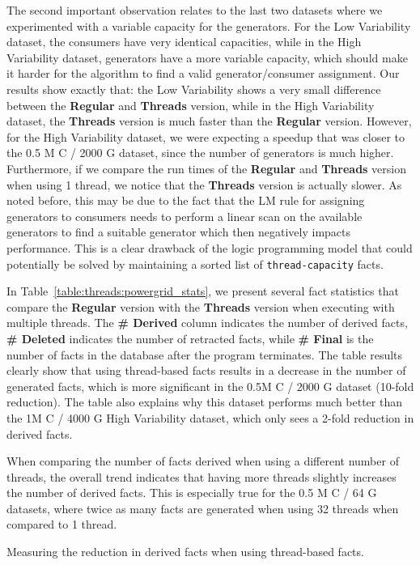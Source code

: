 The second important observation relates to the last two datasets where we
experimented with a variable capacity for the generators. For the Low
Variability dataset, the consumers have very identical capacities, while in the
High Variability dataset, generators have a more variable capacity, which should
make it harder for the algorithm to find a valid generator/consumer assignment.
Our results show exactly that: the Low Variability shows a very small difference
between the \textbf{Regular} and \textbf{Threads} version, while in the High
Variability dataset, the \textbf{Threads} version is much faster than the
\textbf{Regular} version. However, for the High Variability dataset, we were
expecting a speedup that was closer to the 0.5 M C / 2000 G dataset, since the
number of generators is much higher. Furthermore, if we compare the run times of
the \textbf{Regular} and \textbf{Threads} version when using 1 thread, we notice
that the \textbf{Threads} version is actually slower. As noted before, this may
be due to the fact that the LM rule for assigning generators to consumers needs
to perform a linear scan on the available generators to find a suitable
generator which then negatively impacts performance. This is a clear drawback of
the logic programming model that could potentially be solved by maintaining a
sorted list of \texttt{thread-capacity} facts.

In Table~\ref{table:threads:powergrid_stats}, we present several fact statistics
that compare the \textbf{Regular} version with the \textbf{Threads} version when
executing with multiple threads. The \textbf{\# Derived} column indicates the
number of derived facts, \textbf{\# Deleted} indicates the number of retracted
facts, while \textbf{\# Final} is the number of facts in the database after the
program terminates. The table results clearly show that using thread-based facts
results in a decrease in the number of generated facts, which is more
significant in the 0.5M C / 2000 G dataset (10-fold reduction). The table also
explains why this dataset performs much better than the 1M C / 4000 G High
Variability dataset, which only sees a 2-fold reduction in derived facts.

When comparing the number of facts derived when using a different number of
threads, the overall trend indicates that having more threads slightly increases
the number of derived facts. This is especially true for the 0.5 M C / 64 G
datasets, where twice as many facts are generated when using 32 threads when
compared to 1 thread.

\begin{table}[ht]
   \begin{center}
      
   \end{center}

   \caption{Measuring the reduction in derived facts when using thread-based
   facts.}
   \label{table:threads:powergrid_stats}
\end{table}


